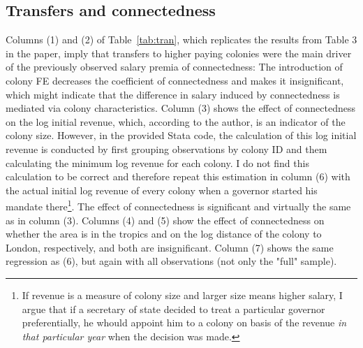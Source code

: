 \documentclass[a4paper]{article}\usepackage[]{graphicx}\usepackage[]{color}
\begin{document}
\subsection{Transfers and connectedness}
\hspace*{5mm} Columns (1) and (2) of Table~\ref{tab:tran}, which replicates the results from Table 3 in the paper, imply that transfers to higher paying colonies were the main driver of the previously observed salary premia of connectedness: The introduction of colony FE decreases the coefficient of connectedness and makes it insignificant, which might indicate that the difference in salary induced by connectedness is mediated via colony characteristics. Column (3) shows the effect of connectedness on the log initial revenue, which, according to the author, is an indicator of the colony size. However, in the provided Stata code, the calculation of this log initial revenue is conducted by first grouping observations by colony ID and them calculating the minimum log revenue for each colony. I do not find this calculation to be correct and therefore repeat this estimation in column (6) with the actual initial log revenue of every colony when a governor started his mandate there\footnote{If revenue is a measure of colony size and larger size means higher salary, I argue that if a secretary of state decided to treat a particular governor preferentially, he whould appoint him to a colony on basis of the revenue \textit{in that particular year} when the decision was made.}. The effect of connectedness is significant and virtually the same as in column (3). Columns (4) and (5) show the effect of connectedness on whether the area is in the tropics and on the log distance of the colony to London, respectively, and both are insignificant. Column (7) shows the same regression as (6), but again with all observations (not only the "full" sample).
\end{document}
